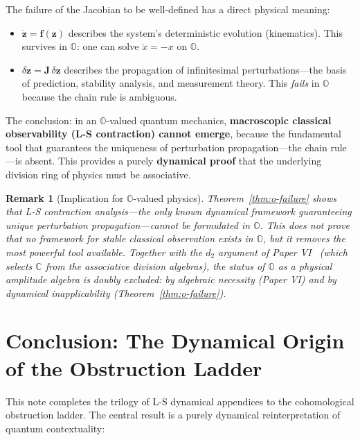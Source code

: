 \documentclass[11pt]{article}
\newtheorem{remark}[theorem]{Remark}
\begin{document}
The failure of the Jacobian to be well-defined has a direct physical
meaning:
\begin{itemize}
  \item \textbf{$\dot{\mathbf{z}} = \mathbf{f}(\mathbf{z})$} describes the
    system's deterministic evolution (kinematics). This survives in
    $\mathbb{O}$: one can solve $\ddot{x} = -x$ on $\mathbb{O}$.
  \item \textbf{$\delta\dot{\mathbf{z}} = \mathbf{J}\,\delta\mathbf{z}$}
    describes the propagation of infinitesimal perturbations---the
    basis of prediction, stability analysis, and measurement theory.
    This \emph{fails} in $\mathbb{O}$ because the chain rule is
    ambiguous.
\end{itemize}
The conclusion: in an $\mathbb{O}$-valued quantum mechanics,
\textbf{macroscopic classical observability (L-S contraction) cannot
emerge}, because the fundamental tool that guarantees the uniqueness
of perturbation propagation---the chain rule---is absent. This provides
a purely \textbf{dynamical proof} that the underlying division ring
of physics must be associative.

\begin{remark}[Implication for $\mathbb{O}$-valued physics]
\label{rem:ls-H3-implication}
Theorem~\ref{thm:o-failure} shows that L-S contraction analysis---the only
known dynamical framework guaranteeing unique perturbation propagation---cannot
be formulated in $\mathbb{O}$. This does not prove that \emph{no} framework for
stable classical observation exists in $\mathbb{O}$, but it removes the most
powerful tool available. Together with the $d_2$ argument of
Paper VI~\cite{PaperVI} (which selects $\mathbb{C}$ from the associative
division algebras), the status of $\mathbb{O}$ as a physical amplitude algebra
is doubly excluded: by algebraic necessity (Paper VI) and by dynamical
inapplicability (Theorem~\ref{thm:o-failure}).
\end{remark}

\section{Conclusion: The Dynamical Origin of the Obstruction Ladder}
\label{sec:conclusion}

This note completes the trilogy of L-S dynamical appendices to the
cohomological obstruction ladder. The central result is a purely
dynamical reinterpretation of quantum contextuality:
\end{document}
